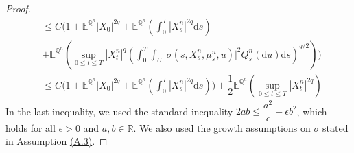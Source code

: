 \documentclass[11pt,amsfonts]{article}
\theoremstyle{plain}
\theoremstyle{assumpstyle}
\numberwithin{equation}{section}
\numberwithin{theorem}{section}
\numberwithin{proposition}{section}
\numberwithin{definition}{section}
\numberwithin{remark}{section}
\numberwithin{corollary}{section}
\numberwithin{lemma}{section}
\begin{document}
\begin{proof}
\begin{equation}
\begin{split}
&\leq C\Bigg(1+\mathbb{E}^{\mathbb{Q}^n}|X_0|^{2q}+\mathbb{E}^{\mathbb{Q}^n}\left( \int_{0}^{T} |X^n_s|^{2q} \mathrm{d}s \right)\\ &+\mathbb{E}^{\mathbb{Q}^n}\left(\sup_{0 \leq t \leq T} |X^n_t|^q\left(\int_0^T \int_{U}^{}\big|\sigma(s,X^n_s, \mu^n_s, u)\big|^2Q^n_s(\mathrm{d}u)\mathrm{d}s\right)^{q/2}\right) \Bigg)\\
&\leq C\Bigg(1+\mathbb{E}^{\mathbb{Q}^n}|X_0|^{2q}+\mathbb{E}^{\mathbb{Q}^n}\left( \int_{0}^{T} |X^n_s|^{2q} \mathrm{d}s \right) \Bigg)  +\dfrac{1}{2} \mathbb{E}^{\mathbb{Q}^n}\left(\sup_{0 \leq t \leq T} |X^n_t|^{2q}\right)
\label{eqlemma1.1}
\end{split}
\end{equation}
In the last inequality, we used the standard inequality $ 2ab \leq \dfrac{a^2}{\epsilon} + \epsilon b^2 $, which holds for all $ \epsilon > 0 $ and $ a, b \in \mathbb{R} $. We also used the growth assumptions on $ \sigma $ stated in Assumption \hyperlink{A.3}{(A.3)}.


\end{proof}
\end{document}
